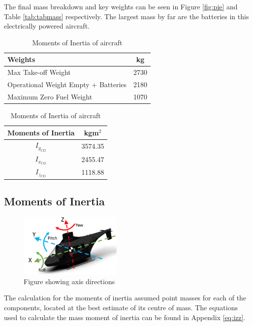 \documentclass[11pt,a4paper]{article}
\begin{document}
The final mass breakdown and key weights can be seen in Figure \ref{fig:pie} and Table \ref{tab:tabmass} respectively. The largest mass by far are the batteries in this electrically powered aircraft.

\begin{table}[H]
	\begin{minipage}{0.5\linewidth}
	\caption{Key weights of aircraft}
		\label{tab:tabmass}
		\centering
\begin{tabular}{lc}
    \hline
    \rowcolor[HTML]{DAE8FC} 
    Weights       & kg   \\ \hline
    Max Take-off Weight          & 2730 \\ \hline
    Operational Weight Empty + Batteries & 2180 \\ \hline
    Maximum Zero Fuel Weight         & 1070 \\ \hline
\end{tabular}
	\end{minipage}\hfill
	\begin{minipage}{0.48\linewidth}
\centering
\caption{Moments of Inertia of aircraft}
		\label{tab:tabinertia}
\begin{tabular}{cc}
\hline
\rowcolor[HTML]{DAE8FC} 
Moments of Inertia & kgm$^2$   \\ \hline
$I_{y_{CG}}$        & 3574.35 \\ \hline
$I_{x_{CG}}$        & 2455.47 \\ \hline
$I_{z_{CG}}$        & 1118.88 \\ \hline
\end{tabular}

	\end{minipage}
\end{table}
\subsection{Moments of Inertia}

\begin{figure}
\begin{center}
    \includegraphics[width=5cm]{AXIS.PNG}
\end{center}
        \caption{Figure showing axis directions}
    \label{fig:axis}
\end{figure}
The calculation for the moments of inertia assumed point masses for each of the components, located at the best estimate of its centre of mass. The equations used to calculate the mass moment of inertia can be found in Appendix \ref{eq:izz}.
\end{document}
